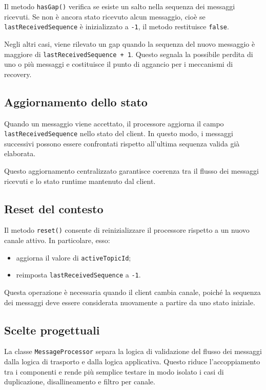 \documentclass[a4paper, 11pt, twoside]{report}
\begin{document}
Il metodo \texttt{hasGap()} verifica se esiste un salto nella sequenza dei messaggi ricevuti. Se non è ancora stato ricevuto alcun messaggio, 
cioè se \texttt{lastReceivedSequence} è inizializzato a \texttt{-1}, il metodo restituisce \texttt{false}.

Negli altri casi, viene rilevato un gap quando la sequenza del nuovo messaggio è maggiore di \texttt{lastReceivedSequence + 1}. Questo segnala 
la possibile perdita di uno o più messaggi e costituisce il punto di aggancio per i meccanismi di recovery.


\subsection{Aggiornamento dello stato}

Quando un messaggio viene accettato, il processore aggiorna il campo \texttt{lastReceivedSequence} nello stato del client. In questo modo, i 
messaggi successivi possono essere confrontati rispetto all'ultima sequenza valida già elaborata.

Questo aggiornamento centralizzato garantisce coerenza tra il flusso dei messaggi ricevuti e lo stato runtime mantenuto dal client.

\subsection{Reset del contesto}

Il metodo \texttt{reset()} consente di reinizializzare il processore rispetto a un nuovo canale attivo. In particolare, esso:

\begin{itemize}
    \item aggiorna il valore di \texttt{activeTopicId};
    \item reimposta \texttt{lastReceivedSequence} a \texttt{-1}.
\end{itemize}

Questa operazione è necessaria quando il client cambia canale, poiché la sequenza dei messaggi deve essere considerata nuovamente a partire da
uno stato iniziale.

\subsection{Scelte progettuali}

La classe \texttt{MessageProcessor} separa la logica di validazione del flusso dei messaggi dalla logica di trasporto e dalla logica applicativa.
Questo riduce l'accoppiamento tra i componenti e rende più semplice testare in modo isolato i casi di duplicazione, disallineamento e filtro per canale.
\end{document}
